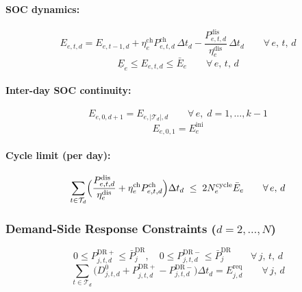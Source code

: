 \documentclass[11pt]{article}
\newcommand{\Pch}{P^{\mathrm{ch}}}
\newcommand{\Pdis}{P^{\mathrm{dis}}}
\begin{document}
\paragraph{SOC dynamics:}
\begin{equation}\label{eq:s1-soc}
  E_{e,t,d} = E_{e,t-1,d}
  + \eta^{\mathrm{ch}}_e \Pch_{e,t,d}\,\Delta t_d
  - \frac{\Pdis_{e,t,d}}{\eta^{\mathrm{dis}}_e}\,\Delta t_d
  \qquad \forall\, e,\,t,\,d
\end{equation}
\begin{equation}\label{eq:s1-soc-bound}
  \underline{E}_e \leq E_{e,t,d} \leq \bar{E}_e
  \qquad \forall\, e,\,t,\,d
\end{equation}

\paragraph{Inter-day SOC continuity:}
\begin{equation}\label{eq:s1-soc-link}
  E_{e,0,d+1} = E_{e,|\mathcal{T}_d|,d}
  \qquad \forall\, e,\; d = 1,\ldots,k{-}1
\end{equation}
\begin{equation}\label{eq:s1-soc-init}
  E_{e,0,1} = E^{\mathrm{ini}}_e
\end{equation}

\paragraph{Cycle limit (per day):}
\begin{equation}\label{eq:s1-cycle}
  \sum_{t \in \mathcal{T}_d}
  \Bigl(\frac{\Pdis_{e,t,d}}{\eta^{\mathrm{dis}}_e}
  + \eta^{\mathrm{ch}}_e \Pch_{e,t,d}\Bigr)\Delta t_d
  \;\leq\; 2 N^{\mathrm{cycle}}_e \bar{E}_e
  \qquad \forall\, e,\, d
\end{equation}

\subsubsection{Demand-Side Response Constraints ($d = 2,\ldots,N$)}

\begin{equation}\label{eq:s1-dr-cap}
  0 \leq P^{\mathrm{DR+}}_{j,t,d} \leq \bar{P}^{\mathrm{DR}}_j,
  \quad
  0 \leq P^{\mathrm{DR-}}_{j,t,d} \leq \bar{P}^{\mathrm{DR}}_j
  \qquad \forall\, j,\,t,\,d
\end{equation}
\begin{equation}\label{eq:s1-dr-energy}
  \sum_{t \in \mathcal{T}_d}
  \bigl(D^{0}_{j,t,d} + P^{\mathrm{DR+}}_{j,t,d}
  - P^{\mathrm{DR-}}_{j,t,d}\bigr)\Delta t_d
  = E^{\mathrm{req}}_{j,d}
  \qquad \forall\, j,\, d
\end{equation}
\end{document}
